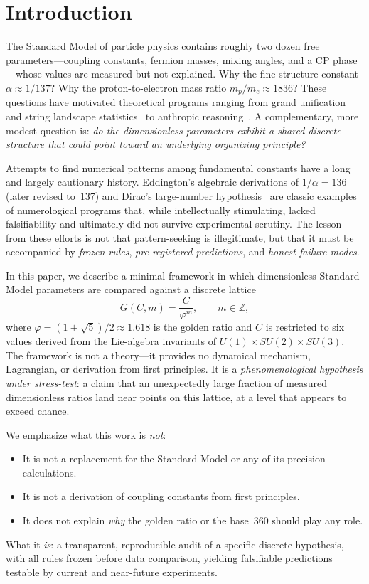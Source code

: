 \documentclass[12pt,a4paper]{article}
\newcommand{\vp}{\varphi}
\begin{document}
\section{Introduction}
\label{sec:intro}

The Standard Model of particle physics contains roughly two dozen free
parameters---coupling constants, fermion masses, mixing angles, and a CP
phase---whose values are measured but not explained.  Why the fine-structure
constant $\alpha \approx 1/137$?  Why the proton-to-electron mass ratio
$m_p/m_e \approx 1836$?  These questions have motivated theoretical programs
ranging from grand unification~\cite{georgi1974,pati1974} and string
landscape statistics~\cite{bousso2000} to anthropic reasoning~\cite{barrow1986}.
A complementary, more modest question is: \emph{do the dimensionless parameters
exhibit a shared discrete structure that could point toward an underlying
organizing principle?}

Attempts to find numerical patterns among fundamental constants have a long
and largely cautionary history.  Eddington's algebraic derivations of
$1/\alpha = 136$ (later revised to~137) and Dirac's large-number
hypothesis~\cite{dirac1937} are classic examples of numerological programs
that, while intellectually stimulating, lacked falsifiability and ultimately
did not survive experimental scrutiny.  The lesson from these efforts is not
that pattern-seeking is illegitimate, but that it must be accompanied by
\emph{frozen rules}, \emph{pre-registered predictions}, and \emph{honest
failure modes}.

In this paper, we describe a minimal framework in which dimensionless Standard
Model parameters are compared against a discrete lattice
\begin{equation}
  G(C,m) = \frac{C}{\vp^m}, \qquad m \in \mathbb{Z},
  \label{eq:lattice}
\end{equation}
where $\vp = (1+\sqrt{5})/2 \approx 1.618$ is the golden ratio and $C$ is
restricted to six values derived from the Lie-algebra invariants of
$U(1)\times SU(2)\times SU(3)$.  The framework is not a theory---it provides
no dynamical mechanism, Lagrangian, or derivation from first principles.  It
is a \emph{phenomenological hypothesis under stress-test}: a claim that an
unexpectedly large fraction of measured dimensionless ratios land near points
on this lattice, at a level that appears to exceed chance.

We emphasize what this work is \emph{not}:
\begin{itemize}[nosep]
  \item It is not a replacement for the Standard Model or any of its
    precision calculations.
  \item It is not a derivation of coupling constants from first principles.
  \item It does not explain \emph{why} the golden ratio or the base~360
    should play any role.
\end{itemize}
What it \emph{is}: a transparent, reproducible audit of a specific discrete
hypothesis, with all rules frozen before data comparison, yielding falsifiable
predictions testable by current and near-future experiments.
\end{document}
